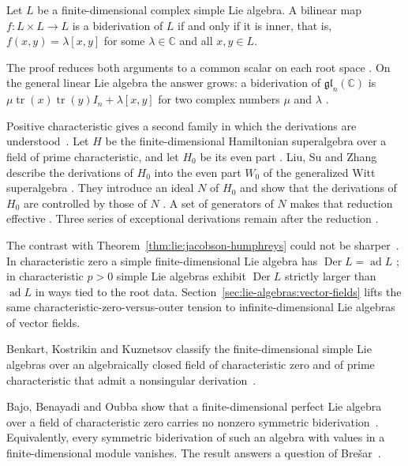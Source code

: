 \begin{theorem}\label{thm:lie:tang-biderivation}
Let $L$ be a finite-dimensional complex simple Lie algebra. A bilinear map
$f\colon L\times L\to L$ is a biderivation of $L$ if and only if it is inner,
that is, $f(x,y)=\lambda[x,y]$ for some $\lambda\in\mathbb{C}$ and all
$x,y\in L$.
\end{theorem}

The proof reduces both arguments to a common scalar on each root space
\cite[pp.~6--7]{Tang2017Biderivations}. On the general linear Lie algebra the
answer grows: a biderivation of $\mathfrak{gl}_n(\mathbb{C})$ is
$\mu\operatorname{tr}(x)\operatorname{tr}(y)I_n+\lambda[x,y]$ for two complex
numbers $\mu$ and $\lambda$ \cite[Theorem~3.2, p.~8]{Tang2017Biderivations}.

Positive characteristic gives a second family in which the derivations are
understood~\cite[p.~2]{LiuSuZhang2005}. Let $H$ be the finite-dimensional Hamiltonian superalgebra over a
field of prime characteristic, and let $H_0$ be its even part
\cite[p.~1]{LiuSuZhang2005}. Liu, Su and Zhang describe the derivations of
$H_0$ into the even part $W_0$ of the generalized Witt superalgebra
\cite[p.~1]{LiuSuZhang2005}. They introduce an ideal $N$ of $H_0$ and show
that the derivations of $H_0$ are controlled by those of $N$
\cite[Theorem~2.4, p.~6]{LiuSuZhang2005}. A set of generators of $N$ makes
that reduction effective \cite[Theorem~2.7, p.~7]{LiuSuZhang2005}. Three
series of exceptional derivations remain after the reduction
\cite[p.~2]{LiuSuZhang2005}.

The contrast with Theorem~\ref{thm:lie:jacobson-humphreys} could not be
sharper~\cite[p.~206]{Jacobson1937}.
In characteristic zero a simple finite-dimensional Lie algebra
has $\operatorname{Der} L=\operatorname{ad} L$ \cite[p.~206]{Jacobson1937};
in characteristic $p>0$
simple Lie algebras exhibit $\operatorname{Der} L$ strictly larger than
$\operatorname{ad} L$ in ways tied to the root data.
Section~\ref{sec:lie-algebras:vector-fields} lifts the same
characteristic-zero-versus-outer tension to infinite-dimensional Lie
algebras of vector fields.

Benkart, Kostrikin and Kuznetsov classify the finite-dimensional simple Lie
algebras over an algebraically closed field of characteristic zero and of
prime characteristic that admit a nonsingular
derivation~\cite{WlFiniteDimensionalSimpleLieAlge1995}.

Bajo, Benayadi and Oubba show that a finite-dimensional perfect Lie algebra
over a field of characteristic zero carries no nonzero symmetric biderivation~\cite{WlNonExistenceOfSymmetricBideriv2025}.
Equivalently, every symmetric biderivation of such an algebra with values
in a finite-dimensional module vanishes. The result answers a question of
Bre\v{s}ar~\cite{WlNonExistenceOfSymmetricBideriv2025}.

